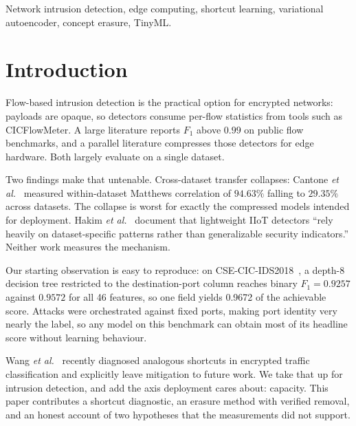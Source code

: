 \documentclass[conference]{IEEEtran}
\newcommand{\SRRport}{0.9257}
\newcommand{\SRRall}{0.9572}
\newcommand{\SRRratio}{0.9672}
\begin{document}
\begin{IEEEkeywords}
Network intrusion detection, edge computing, shortcut learning, variational autoencoder,
concept erasure, TinyML.
\end{IEEEkeywords}

\section{Introduction}
Flow-based intrusion detection is the practical option for encrypted networks: payloads are
opaque, so detectors consume per-flow statistics from tools such as CICFlowMeter. A large
literature reports $F_1$ above $0.99$ on public flow benchmarks, and a parallel literature
compresses those detectors for edge hardware. Both largely evaluate on a single dataset.

Two findings make that untenable. Cross-dataset transfer collapses: Cantone \emph{et
al.}~\cite{cantone2024crossdataset} measured within-dataset Matthews correlation of
$94.63\%$ falling to $29.35\%$ across datasets. The collapse is worst for exactly the compressed
models intended for deployment. Hakim \emph{et al.}~\cite{hakim2026crossdomain} document
that lightweight IIoT detectors ``rely heavily on dataset-specific patterns rather than
generalizable security indicators.'' Neither work measures the mechanism.

Our starting observation is easy to reproduce: on
CSE-CIC-IDS2018~\cite{sharafaldin2018toward}, a depth-8 decision tree restricted to the
destination-port column reaches binary $F_1 = \SRRport$ against $\SRRall$ for all 46
features, so one field yields \SRRratio{} of the achievable score. Attacks were orchestrated
against fixed ports, making port identity very nearly the label, so any model on this
benchmark can obtain most of its headline score without learning behaviour.

Wang \emph{et al.}~\cite{wang2026bias} recently diagnosed analogous shortcuts in encrypted
traffic classification and explicitly leave mitigation to future work. We take that up for
intrusion detection, and add the axis deployment cares about: capacity. This paper
contributes a shortcut diagnostic, an erasure method with verified removal, and an honest
account of two hypotheses that the measurements did not support.

\end{document}
